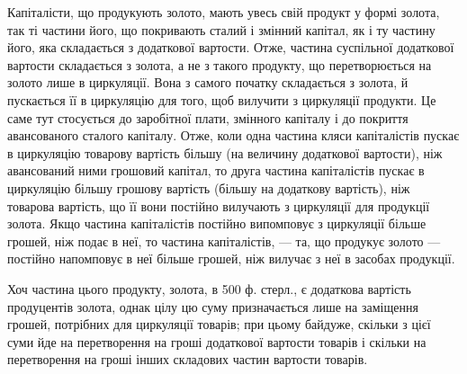 Капіталісти, що продукують золото, мають увесь свій продукт у
формі золота, так ті частини його, що покривають сталий і змінний
капітал, як і ту частину його, яка складається з додаткової вартости.
Отже, частина суспільної додаткової вартости складається з золота, а
не з такого продукту, що перетворюється на золото лише в циркуляції.
Вона з самого початку складається з золота, й пускається її в циркуляцію
для того, щоб вилучити з циркуляції продукти. Це саме тут стосується
до заробітної плати, змінного капіталу і до покриття авансованого
сталого капіталу. Отже, коли одна частина кляси капіталістів пускає в
циркуляцію товарову вартість більшу (на величину додаткової вартости),
ніж авансований ними грошовий капітал, то друга частина капіталістів
пускає в циркуляцію більшу грошову вартість (більшу на додаткову
вартість), ніж товарова вартість, що її вони постійно вилучають з циркуляції
для продукції золота. Якщо частина капіталістів постійно випомповує
з циркуляції більше грошей, ніж подає в неї, то частина капіталістів,
— та, що продукує золото — постійно напомповує в неї більше
грошей, ніж вилучає з неї в засобах продукції.

Хоч частина цього продукту, золота, в 500 ф. стерл., є додаткова
вартість продуцентів золота, однак цілу цю суму призначається лише на
заміщення грошей, потрібних для циркуляції товарів; при цьому байдуже,
скільки з цієї суми йде на перетворення на гроші додаткової вартости
товарів і скільки на перетворення на гроші інших складових частин
вартости товарів.

